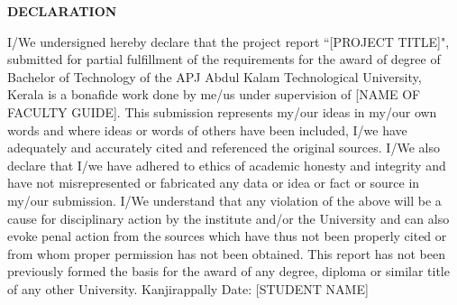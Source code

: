 \begin{titlepage}
\begin{center} 
\textbf {\Large{DECLARATION}} 
\end{center}
I/We undersigned hereby declare that the project report ``[PROJECT TITLE]", submitted for partial fulfillment of the requirements for the award of degree of Bachelor of Technology of the APJ Abdul Kalam Technological University, Kerala is a bonafide work done by me/us under supervision of [NAME OF FACULTY GUIDE]. This submission represents my/our ideas in my/our own words and where ideas or words of others have been included, I/we have adequately and accurately cited and referenced the original sources. I/We also declare that I/we have adhered to ethics of academic honesty and integrity and have not misrepresented or fabricated any data or idea or fact or source in my/our submission. I/We understand that any violation of the above will be a cause for disciplinary action by the institute and/or the University and can also evoke penal action from the sources which have thus not been properly cited or from whom proper permission has not been obtained. This report has not been previously formed the basis for the award of any degree, diploma or similar title of any other University.
\vspace{20pt}
\newline  Kanjirappally
\vspace{1pt}
\newline Date: \hspace{320pt} 
\newline \vspace{1pt} \hspace{320pt} [STUDENT NAME]
\end{titlepage}
